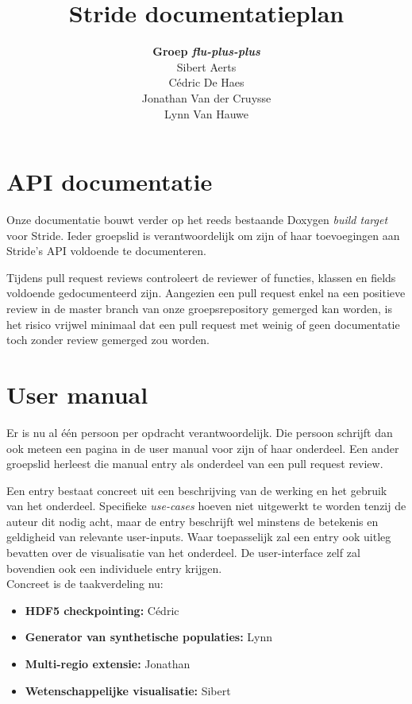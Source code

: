 \documentclass[10pt,a4paper]{article}
\author{\textbf{Groep \emph{flu-plus-plus}} \\ Sibert Aerts \\ Cédric De Haes \\ Jonathan Van der Cruysse \\ Lynn Van Hauwe}
\title{Stride documentatieplan}
\begin{document}
	
	\newcommand{\titleitem}[1]{\item \textbf{#1}}

	\maketitle
	
	\section{API documentatie}
	
	Onze documentatie bouwt verder op het reeds bestaande Doxygen \emph{build target} voor Stride. Ieder groepslid is verantwoordelijk om zijn of haar toevoegingen aan Stride's API voldoende te documenteren.
	
	Tijdens pull request reviews controleert de reviewer of functies, klassen en fields voldoende gedocumenteerd zijn. Aangezien een pull request enkel na een positieve review in de master branch van onze groepsrepository gemerged kan worden, is het risico vrijwel minimaal dat een pull request met weinig of geen documentatie toch zonder review gemerged zou worden.
	
	\section{User manual}
	
	Er is nu al \'e\'en persoon per opdracht verantwoordelijk. Die persoon schrijft dan ook meteen een pagina in de user manual voor zijn of haar onderdeel. Een ander groepslid herleest die manual entry als onderdeel van een pull request review.
	
	Een entry bestaat concreet uit een beschrijving van de werking en het gebruik van het onderdeel. Specifieke \textit{use-cases} hoeven niet uitgewerkt te worden tenzij de auteur dit nodig acht, maar de entry beschrijft wel minstens de betekenis en geldigheid van relevante user-inputs. Waar toepasselijk zal een entry ook uitleg bevatten over de visualisatie van het onderdeel. De user-interface zelf zal bovendien ook een individuele entry krijgen.  \\
	
	Concreet is de taakverdeling nu:
	
	\begin{itemize}
		\titleitem{HDF5 checkpointing:} Cédric
		\titleitem{Generator van synthetische populaties:} Lynn
		\titleitem{Multi-regio extensie:} Jonathan
		\titleitem{Wetenschappelijke visualisatie:} Sibert
	\end{itemize}
\end{document}
